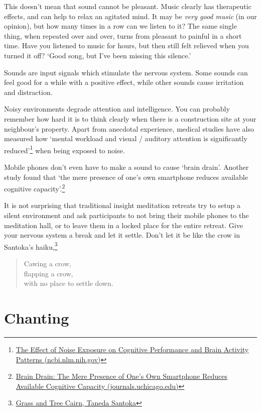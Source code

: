 \noindent This doesn't mean that sound cannot be pleasant. Music clearly
has therapeutic effects, and can help to relax an agitated mind. It may
be \emph{very good music} (in our opinion), but how many times in a row
can we listen to it? The same single thing, when repeated over and over,
turns from pleasant to painful in a short time. Have you listened to
music for hours, but then still felt relieved when you turned it off?
`Good song, but I've been missing this silence.'

Sounds are input signals which stimulate the nervous system. Some sounds
can feel good for a while with a positive effect, while other sounds
cause irritation and distraction.

Noisy environments degrade attention and intelligence. You can probably
remember how hard it is to think clearly when there is a construction
site at your neighbour's property. Apart from anecdotal experience,
medical studies have also measured how `mental workload and visual /
auditory attention is significantly reduced'\footnote{\href{https://www.ncbi.nlm.nih.gov/pmc/articles/PMC6901841/}{The
  Effect of Noise Exposure on Cognitive Performance and Brain Activity
  Patterns (ncbi.nlm.nih.gov)}} when being exposed to noise.

\enlargethispage*{\baselineskip}

Mobile phones don't even have to make a sound to cause `brain drain'.
Another study found that `the mere presence of one's own smartphone
reduces available cognitive capacity'.\footnote{\href{https://www.journals.uchicago.edu/doi/10.1086/691462}{Brain
  Drain: The Mere Presence of One's Own Smartphone Reduces Available
  Cognitive Capacity (journals.uchicago.edu)}}

It is not surprising that traditional insight meditation retreats try to
setup a silent environment and ask participants to not bring their
mobile phones to the meditation hall, or to leave them in a locked place
for the entire retreat. Give your nervous system a break and let it
settle. Don't let it be like the crow in Santoka's haiku,\footnote{\href{https://www.goodreads.com/book/show/931086.Grass_and_Tree_Cairn}{Grass
  and Tree Cairn, Taneda Santoka}}

\begin{quote}
Cawing a crow,\\
flapping a crow,\\
with no place to settle down.
\end{quote}

\section{Chanting}


